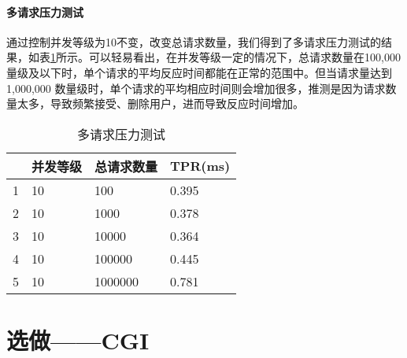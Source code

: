 \paragraph*{多请求压力测试} 通过控制并发等级为10不变，改变总请求数量，我们得到了多请求压力测试的结果，如表\ref{tab:multiple}所示。可以轻易看出，在并发等级一定的情况下，总请求数量在100,000量级及以下时，单个请求的平均反应时间都能在正常的范围中。但当请求量达到1,000,000 数量级时，单个请求的平均相应时间则会增加很多，推测是因为请求数量太多，导致频繁接受、删除用户，进而导致反应时间增加。

\begin{table}[htbp!]
    \centering
    \begin{tabular}{llll}\hline
      & 并发等级 & 总请求数量 & TPR(ms)   \\\hline
    1 & 10      & 100       & 0.395 \\
    2 & 10      & 1000      & 0.378 \\
    3 & 10      & 10000     & 0.364\\
    4 & 10      & 100000    & 0.445\\
    5 & 10      & 1000000   & 0.781\\
    \hline
    \end{tabular}
    \caption{多请求压力测试}\label{tab:multiple}
\end{table}

\section{选做——CGI}

